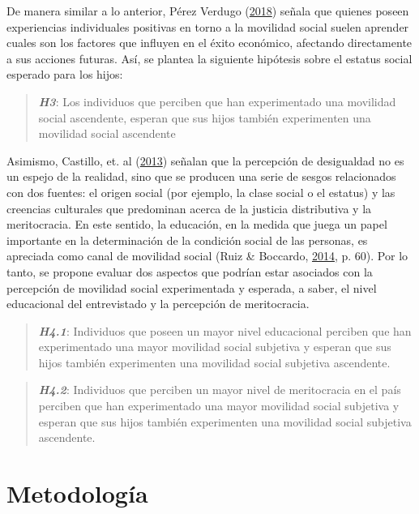 \documentclass[
]{article}
\begin{document}
De manera similar a lo anterior, Pérez Verdugo
(\protect\hyperlink{ref-perezverdugo_Factores_2018}{2018}) señala que
quienes poseen experiencias individuales positivas en torno a la
movilidad social suelen aprender cuales son los factores que influyen en
el éxito económico, afectando directamente a sus acciones futuras. Así,
se plantea la siguiente hipótesis sobre el estatus social esperado para
los hijos:

\begin{quote}
\textbf{\emph{H3}}: Los individuos que perciben que han experimentado
una movilidad social ascendente, esperan que sus hijos también
experimenten una movilidad social ascendente
\end{quote}

Asimismo, Castillo, et. al
(\protect\hyperlink{ref-castillo_Educacion_2013}{2013}) señalan que la
percepción de desigualdad no es un espejo de la realidad, sino que se
producen una serie de sesgos relacionados con dos fuentes: el origen
social (por ejemplo, la clase social o el estatus) y las creencias
culturales que predominan acerca de la justicia distributiva y la
meritocracia. En este sentido, la educación, en la medida que juega un
papel importante en la determinación de la condición social de las
personas, es apreciada como canal de movilidad social (Ruiz \& Boccardo,
\protect\hyperlink{ref-ruiz_chilenos_2014}{2014}, p. 60). Por lo tanto,
se propone evaluar dos aspectos que podrían estar asociados con la
percepción de movilidad social experimentada y esperada, a saber, el
nivel educacional del entrevistado y la percepción de meritocracia.

\begin{quote}
\textbf{\emph{H4.1}}: Individuos que poseen un mayor nivel educacional
perciben que han experimentado una mayor movilidad social subjetiva y
esperan que sus hijos también experimenten una movilidad social
subjetiva ascendente.
\end{quote}

\begin{quote}
\textbf{\emph{H4.2}}: Individuos que perciben un mayor nivel de
meritocracia en el país perciben que han experimentado una mayor
movilidad social subjetiva y esperan que sus hijos también experimenten
una movilidad social subjetiva ascendente.
\end{quote}

\hypertarget{metodologuxeda}{%
\section{Metodología}\label{metodologuxeda}}
\end{document}
